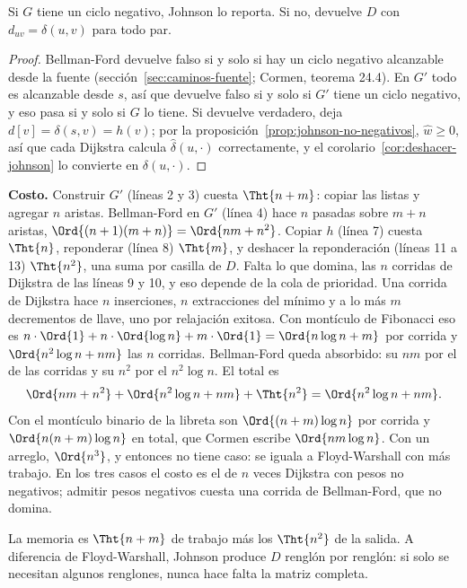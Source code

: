 \documentclass[11pt,letterpaper]{article}
\begin{document}
\begin{teorema}
  \label{teo:johnson-correcto}
  Si $G$ tiene un ciclo negativo, Johnson lo reporta. Si no,
  devuelve $D$ con $d_{uv} = \delta(u, v)$ para todo par.
\end{teorema}

\begin{proof}
  Bellman-Ford devuelve falso si y solo si hay un ciclo negativo
  alcanzable desde la fuente (sección~\ref{sec:caminos-fuente};
  Cormen, teorema 24.4). En $G'$ todo es alcanzable desde $s$, así que
  devuelve falso si y solo si $G'$ tiene un ciclo negativo, y eso pasa
  si y solo si $G$ lo tiene. Si devuelve verdadero, deja
  $d[v] = \delta(s, v) = h(v)$; por la
  proposición~\ref{prop:johnson-no-negativos}, $\hat{w} \ge 0$, así
  que cada Dijkstra calcula $\hat{\delta}(u, \cdot)$ correctamente, y
  el corolario~\ref{cor:deshacer-johnson} lo convierte en
  $\delta(u, \cdot)$.
\end{proof}

\textbf{Costo.} Construir $G'$ (líneas 2 y 3) cuesta $\Tht{n + m}$:
copiar las listas y agregar $n$ aristas. Bellman-Ford en $G'$
(línea 4) hace $n$ pasadas sobre $m + n$ aristas,
$\Ord{(n + 1)(m + n)} = \Ord{nm + n^2}$. Copiar $h$ (línea 7) cuesta
$\Tht{n}$, reponderar (línea 8) $\Tht{m}$, y deshacer la reponderación
(líneas 11 a 13) $\Tht{n^2}$, una suma por casilla de $D$. Falta lo
que domina, las $n$ corridas de Dijkstra de las líneas 9 y 10, y eso
depende de la cola de prioridad.
Una corrida de Dijkstra hace $n$ inserciones, $n$ extracciones del
mínimo y a lo más $m$ decrementos de llave, uno por relajación
exitosa. Con montículo de Fibonacci eso es
$n \cdot \Ord{1} + n \cdot \Ord{\log n} + m \cdot \Ord{1}
= \Ord{n \log n + m}$ por corrida y $\Ord{n^2 \log n + nm}$ las $n$
corridas. Bellman-Ford queda absorbido: su $nm$ por el de las
corridas y su $n^2$ por el $n^2 \log n$. El total es
\[
  \Ord{nm + n^2} + \Ord{n^2 \log n + nm} + \Tht{n^2}
  = \Ord{n^2 \log n + nm} .
\]
Con el montículo binario de la libreta son $\Ord{(n + m)\log n}$ por
corrida y $\Ord{n(n + m)\log n}$ en total, que Cormen escribe
$\Ord{nm \log n}$. Con un arreglo, $\Ord{n^3}$, y entonces no tiene
caso: se iguala a Floyd-Warshall con más trabajo. En los tres casos el
costo es el de $n$ veces Dijkstra con pesos no negativos; admitir
pesos negativos cuesta una corrida de Bellman-Ford, que no domina.

La memoria es $\Tht{n + m}$ de trabajo más los $\Tht{n^2}$ de la
salida. A diferencia de Floyd-Warshall, Johnson produce $D$ renglón
por renglón: si solo se necesitan algunos renglones, nunca hace falta
la matriz completa.
\end{document}
